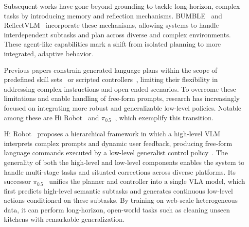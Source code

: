 \documentclass[10pt, a4paper, logo, copyright]{googledeepmind} %
\begin{document}
Subsequent works have gone beyond grounding to tackle long-horizon, complex tasks by introducing memory and reflection mechanisms. 
BUMBLE~\cite{shah2024bumble} and ReflectVLM~\cite{feng2025reflective} incorporate these mechanisms, allowing systems to handle interdependent subtasks and plan across diverse and complex environments. 
These agent-like capabilities mark a shift from isolated planning to more integrated, adaptive behavior.

Previous papers constrain generated language plans within the scope of predefined skill sets~\cite{huang2022language, zeng2022socratic, saycan2022arxiv, huang2022inner} or scripted controllers~\cite{hu2023look, feng2025reflective}, limiting their flexibility in addressing complex instructions and open-ended scenarios. To overcome these limitations and enable handling of free-form prompts, research has increasingly focused on integrating more robust and generalizable low-level policies.
Notable among these are Hi Robot~\cite{shi2025hi} and $\pi_{0.5}$~\cite{intelligence2025pi05visionlanguageactionmodelopenworld}, which exemplify this transition.

Hi Robot~\cite{shi2025hi} proposes a hierarchical framework in which a high-level VLM interprets complex prompts and dynamic user feedback, producing free-form language commands executed by a low-level generalist control policy~\cite{black2410pi0}. The generality of both the high-level and low-level components enables the system to handle multi-stage tasks and situated corrections across diverse platforms.
Its successor $\pi_{0.5}$~\cite{intelligence2025pi05visionlanguageactionmodelopenworld}
unifies the planner and controller into a single VLA model, which first predicts high-level semantic subtasks and generates continuous low-level actions conditioned on these subtasks. By training on web-scale heterogeneous data, it can perform long-horizon, open-world tasks such as cleaning unseen kitchens with remarkable generalization.
\end{document}
